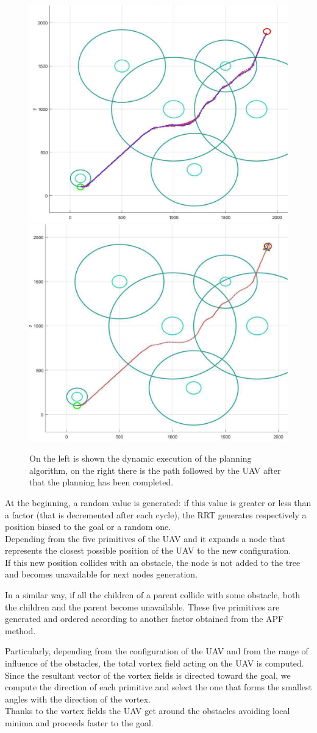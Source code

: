 \documentclass[oneside,onecolumn]{article}
\begin{document}
\begin{figure}
\centering
   {\includegraphics[width=.45\textwidth]{execution}} \quad
   {\includegraphics[width=.45\textwidth]{finalPath}} \\
\caption{On the left is shown the dynamic execution of the planning algorithm,
  on the right there is the path followed by the UAV after that the planning has been completed.}
\label{fig:subfig2}
\end{figure}
At the beginning, a random value is generated:  if this value is greater or less
than a factor (that is decremented after each cycle), the RRT generates
respectively a position biased to the goal or a random one.\\
Depending from the five primitives of the UAV and it expands a node that
represents the closest possible position of the UAV to the new configuration.\\
If this new position collides with an obstacle, the node is not added to the
tree and becomes unavailable for next nodes generation.\\\par
In a similar way, if all the children of a parent collide with some obstacle,
both the children and the parent become unavailable.
These five primitives are generated and ordered according to another factor
obtained from the APF method.\\\par
Particularly, depending from the configuration of the UAV and from the range
of influence of the obstacles, the total vortex field acting on the UAV is computed.\\
Since the resultant vector of the vortex fields is directed toward the goal, we
compute the direction of each primitive and select the one that forms the
smallest angles with the direction of the vortex.\\
Thanks to the vortex fields the UAV get around the obstacles avoiding local
minima and proceeds faster to the goal.
\end{document}
